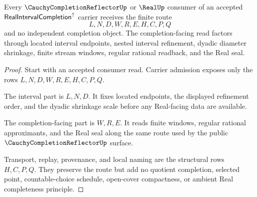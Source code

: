 \begin{theorem}
\label{thm:real-interval-completion-handoff}
Every $\CauchyCompletionReflectorUp$ or $\RealUp$ consumer of an accepted $\mathsf{RealIntervalCompletion}^{\uparrow}$ carrier receives the finite route
$$
L,N,D,W,R,E,H,C,P,Q
$$
and no independent completion object. The completion-facing read factors through located interval endpoints, nested interval refinement, dyadic diameter shrinkage, finite stream windows, regular rational readback, and the Real seal.
\end{theorem}
\begin{proof}
Start with an accepted consumer read. Carrier admission exposes only the rows $L,N,D,W,R,E,H,C,P,Q$.

The interval part is $L,N,D$. It fixes located endpoints, the displayed refinement order, and the dyadic shrinkage scale before any Real-facing data are available.

The completion-facing part is $W,R,E$. It reads finite windows, regular rational approximants, and the Real seal along the same route used by the public $\CauchyCompletionReflectorUp$ surface.

Transport, replay, provenance, and local naming are the structural rows $H,C,P,Q$. They preserve the route but add no quotient completion, selected point, countable-choice schedule, open-cover compactness, or ambient Real completeness principle.
\end{proof}

\begin{closurestatus}{\RealIntervalCompletionUp}
  \theoryclosure{\seedClosure}
  \formalstatus{\unformalizedV}
\end{closurestatus}
